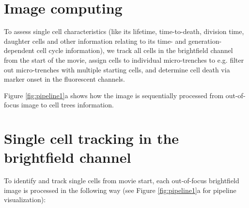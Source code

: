 \documentclass[pdftex,12pt,a4paper]{report}
\begin{document}
\section{Image computing}

To assess single cell characteristics (like its lifetime, time-to-death, division time, daughter cells and other information relating to its time- and generation-dependent cell cycle information), we track all cells in the brightfield channel from the start of the movie, assign cells to individual micro-trenches to e.g. filter out micro-trenches with multiple starting cells, and determine cell death via marker onset in the fluorescent channels.

Figure \ref{fig:pipeline1}a shows how the image is sequentially processed from out-of-focus image to cell trees information.

\section{Single cell tracking in the brightfield channel}

To identify and track single cells from movie start, each out-of-focus brightfield image is processed in the following way (see Figure \ref{fig:pipeline1}a for pipeline visualization): 
\end{document}
